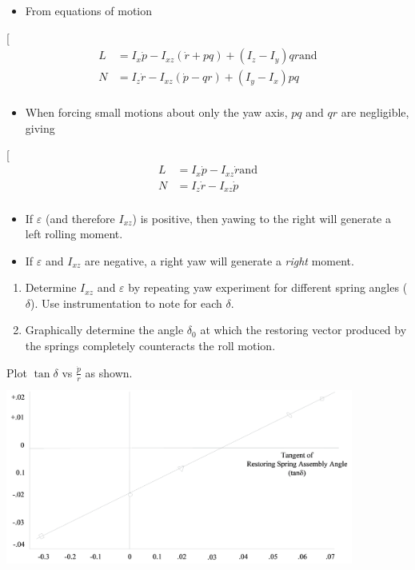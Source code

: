 \documentclass[
]{book}
\providecommand{\tightlist}{%
  \setlength{\itemsep}{0pt}\setlength{\parskip}{0pt}}
\begin{document}
\begin{itemize}
\tightlist
\item
  From equations of motion
\end{itemize}

{[}
\begin{align}
L &= I_x \dot{p} - I_{xz} \left( \dot{r} + pq \right) + \left( I_z - I_y \right) qr \text{and} \\
N &= I_z \dot{r} - I_{xz} \left( \dot{p} - qr \right) + \left( I_y - I_x \right) pq \\
\end{align}

\begin{itemize}
\tightlist
\item
  When forcing small motions about only the yaw axis, \(pq\) and \(qr\) are negligible, giving
\end{itemize}

{[}
\begin{align}
L &= I_x \dot{p} - I_{xz} \dot{r} \text{and} \\
N &=  I_z \dot{r} - I_{xz} \dot{p} \\
\end{align}

\begin{itemize}
\tightlist
\item
  If \(\varepsilon\) (and therefore \(I_{xz}\)) is positive, then yawing to the right will generate a left rolling moment.
\item
  If \(\varepsilon\) and \(I_{xz}\) are negative, a right yaw will generate a \emph{right} moment.
\end{itemize}

\begin{enumerate}
\def\labelenumi{\arabic{enumi}.}
\tightlist
\item
  Determine \(I_{xz}\) and \(\varepsilon\) by repeating yaw experiment for different spring angles (\(\delta\)). Use instrumentation to note for each \(\delta\).
\item
  Graphically determine the angle \(\delta_0\) at which the restoring vector produced by the springs completely counteracts the roll motion.
\end{enumerate}

Plot \(\tan{\delta}\) vs \(\frac{\dot{p}}{\dot{r}}\) as shown.
\includegraphics[width=4.5in,height=2.5in]{media/07/image47.svg}
\end{document}
